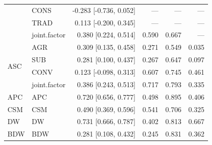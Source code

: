 \begin{table}[htbp]
\begin{tabular}{llrrrr}
 & \quad CONS & -0.283 [-0.736, 0.052] & --- & --- & --- \\
 & \quad TRAD & 0.113 [-0.200, 0.345] & --- & --- & --- \\
 & \quad joint.factor & 0.380 [0.224, 0.514] & 0.590 & 0.667 & --- \\
\hline
\multirow{4}{*}{ASC} & \quad AGR & 0.309 [0.135, 0.458] & 0.271 & 0.549 & 0.035 \\
 & \quad SUB & 0.281 [0.100, 0.437] & 0.267 & 0.647 & 0.097 \\
 & \quad CONV & 0.123 [-0.098, 0.313] & 0.607 & 0.745 & 0.461 \\
 & \quad joint.factor & 0.386 [0.243, 0.513] & 0.717 & 0.793 & 0.335 \\
\hline
APC & \quad APC & 0.720 [0.656, 0.777] & 0.498 & 0.895 & 0.406 \\
\hline
CSM & \quad CSM & 0.490 [0.369, 0.596] & 0.541 & 0.706 & 0.325 \\
\hline
DW & \quad DW & 0.731 [0.666, 0.787] & 0.402 & 0.813 & 0.667 \\
\hline
BDW & \quad BDW & 0.281 [0.108, 0.432] & 0.245 & 0.831 & 0.362 \\
\hline\end{tabular}
\end{table}
